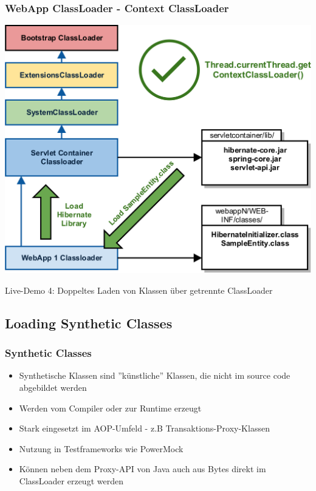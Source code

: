 \documentclass[aspectratio=169]{beamer}
\begin{document}
	\begin{frame}
		\frametitle{WebApp ClassLoader - Context ClassLoader}
		\begin{center}
			\includegraphics[scale=0.1]{assets/contextclassloader/webappclassloader-3.png} 
		\end{center}
	\end{frame}

	\begin{frame}
		Live-Demo 4: Doppeltes Laden von Klassen über getrennte ClassLoader
	\end{frame}

	\subsection{Loading Synthetic Classes}

	\begin{frame}
		\frametitle{Synthetic Classes}
		\begin{itemize}
			\item{Synthetische Klassen sind ''künstliche'' Klassen, die nicht im source code abgebildet werden}
			\item{Werden vom Compiler oder zur Runtime erzeugt}
			\item{Stark eingesetzt im AOP-Umfeld - z.B Transaktions-Proxy-Klassen}
			\item{Nutzung in Testframeworks wie PowerMock}
			\item{Können neben dem Proxy-API von Java auch aus Bytes direkt im ClassLoader erzeugt werden}
		\end{itemize}
	\end{frame}
\end{document}
